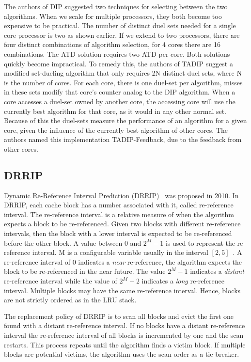 The authors of DIP suggested two techniques for selecting between the two algorithms. 
When we scale for multiple processors, they both become too expensive to be practical.
The number of distinct duel sets needed for a single core processor is two as shown earlier.
If we extend to two processors, there are four distinct combinations of algorithm selection, for 4 cores there are 16 combinations.
The ATD solution requires two ATD per core.
Both solutions quickly become impractical.
To remedy this, the authors of TADIP suggest a modified set-dueling algorithm that only requires 2N distinct duel sets, where N is the number of cores.
For each core, there is one duel-set per algorithm, misses in these sets modify that core's counter analog to the DIP algorithm.
When a core accesses a duel-set owned by another core, the accessing core will use the currently best algorithm for that core, as it would in any other normal set.
Because of this the duel-sets measure the performance of an algorithm for a given core, given the influence of the currently best algorithm of other cores.
The authors named this implementation TADIP-Feedback, due to the feedback from other cores.

\subsection{DRRIP}

Dynamic Re-Reference Interval Prediction (DRRIP)~\cite{Jaleel2010} was proposed in 2010.
In DRRIP, each cache block has a number associated with it, called re-reference interval.
The re-reference interval is a relative measure of when the algorithm expects a block to be re-referenced.
Given two blocks with different re-reference intervals, then the block with a lower interval is expected to be re-referenced before the other block.
A value between 0 and $2^M - 1$ is used to represent the re-reference interval.
M is a configurable variable usually in the interval $[2, 5]$~\cite{Jaleel2010}.
A re-reference interval of 0 indicates a \textit{near} re-reference, the algorithm expects the block to be re-referenced in the near future.
The value $2^M - 1$ indicates a \textit{distant} re-reference interval while the value of $2^M - 2$ indicates a \textit{long} re-reference interval.
Multiple blocks may have the same re-reference interval. 
Hence, blocks are not strictly ordered as in the LRU stack.

The replacement policy of DRRIP is to scan all blocks and evict the first one found with a distant re-reference interval.
If no blocks have a distant re-reference interval the re-reference interval of all blocks is incremented by one and the scan restarts.
This process repeats until the algorithm finds a victim block.
If multiple blocks are potential victims, the algorithm uses the scan order as a tie-breaker.

